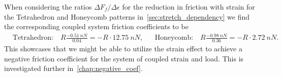 When considering the ratios $\Delta F_f / \Delta \epsilon$ for the reduction in friction with strain for the Tetrahedron and Honeycomb patterns in~\cref{sec:stretch_dependency} we find the corresponding coupled system friction coefficients to be 
\begin{align}
  &\text{Tetrahedron:} \quad R\frac{-\SI{0.51}{nN}}{0.04} = -R\cdot\SI{12.75}{nN},& &\text{Honeycomb:} \quad R\frac{-\SI{0.98}{nN}}{0.36} = -R\cdot\SI{2.72}{nN}.&
  \label{eq:pilot_study_mu_estimate}
\end{align}
This showcases that we might be able to utilize the strain effect to achieve a negative friction coefficient for the system of coupled strain and load. This is investigated further in~\cref{chap:negative_coef}.







